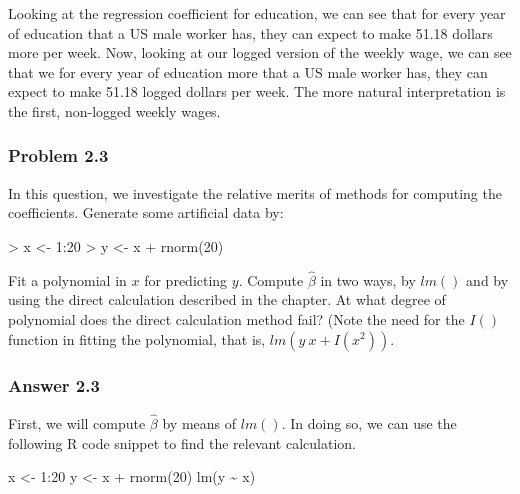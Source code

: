\documentclass[
]{article}
\newenvironment{Shaded}{\begin{snugshade}}{\end{snugshade}}
\newcommand{\DecValTok}[1]{\textcolor[rgb]{0.00,0.00,0.81}{#1}}
\newcommand{\FunctionTok}[1]{\textcolor[rgb]{0.00,0.00,0.00}{#1}}
\newcommand{\NormalTok}[1]{#1}
\newcommand{\OtherTok}[1]{\textcolor[rgb]{0.56,0.35,0.01}{#1}}
\newcommand{\SpecialCharTok}[1]{\textcolor[rgb]{0.00,0.00,0.00}{#1}}
\begin{document}
Looking at the regression coefficient for education, we can see that for
every year of education that a US male worker has, they can expect to
make 51.18 dollars more per week. Now, looking at our logged version of
the weekly wage, we can see that we for every year of education more
that a US male worker has, they can expect to make 51.18 logged dollars
per week. The more natural interpretation is the first, non-logged
weekly wages.

\hypertarget{problem-2.3}{%
\subsubsection{Problem 2.3}\label{problem-2.3}}

In this question, we investigate the relative merits of methods for
computing the coefficients. Generate some artificial data by:

\begin{Shaded}
\begin{Highlighting}[]
\NormalTok{\textgreater{} x \textless{}{-} 1:20}
\NormalTok{\textgreater{} y \textless{}{-} x + rnorm(20)}
\end{Highlighting}
\end{Shaded}

Fit a polynomial in \(x\) for predicting \(y\). Compute \(\hat{\beta}\)
in two ways, by \(lm()\) and by using the direct calculation described
in the chapter. At what degree of polynomial does the direct calculation
method fail? (Note the need for the \(I()\) function in fitting the
polynomial, that is, \(lm(y ~ x + I(x^2))\).

\hypertarget{answer-2.3}{%
\subsubsection{Answer 2.3}\label{answer-2.3}}

First, we will compute \(\hat{\beta}\) by means of \(lm()\). In doing
so, we can use the following R code snippet to find the relevant
calculation.

\begin{Shaded}
\begin{Highlighting}[]
\NormalTok{  x }\OtherTok{\textless{}{-}} \DecValTok{1}\SpecialCharTok{:}\DecValTok{20}
\NormalTok{  y }\OtherTok{\textless{}{-}}\NormalTok{ x }\SpecialCharTok{+} \FunctionTok{rnorm}\NormalTok{(}\DecValTok{20}\NormalTok{)}
  \FunctionTok{lm}\NormalTok{(y }\SpecialCharTok{\textasciitilde{}}\NormalTok{ x)}
\end{Highlighting}
\end{Shaded}
\end{document}
